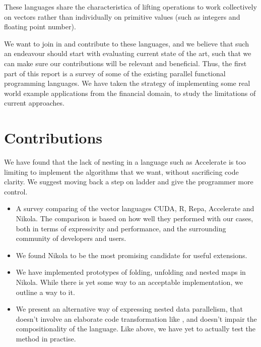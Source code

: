 These languages share the characteristica of lifting operations to
work collectively on vectors rather than individually on primitive
values (such as integers and floating point number).

We want to join in and contribute to these languages, and we believe
that such an endeavour should start with evaluating current state of
the art, such that we can make sure our contributions will be relevant
and beneficial. Thus, the first part of this report is a survey of
some of the existing parallel functional programming languages. We
have taken the strategy of implementing some real world example
applications from the financial domain, to study the limitations of
current approaches.

\section{Contributions}


We have found that the lack of nesting in a language such as
Accelerate is too limiting to implement the algorithms that we want,
without sacrificing code clarity. We suggest moving back a step on
ladder and give the programmer more control.



\begin{itemize}

\item A survey comparing of the vector languages CUDA, R, Repa, Accelerate and
  Nikola. The comparison is based on how well they performed with our cases,
  both in terms of expressivity and performance, and the surrounding community
  of developers and users.

\item We found Nikola to be the most promising candidate for useful extensions.

\item We have implemented prototypes of folding, unfolding and nested maps in
  Nikola. While there is yet some way to an acceptable implementation, we
  outline a way to it.

\item We present an alternative way of expressing nested data parallelism, that
  doesn't involve an elaborate code transformation like \cite{nesl}, and
  doesn't impair the compositionality of the language. Like above, we have yet
  to actually test the method in practise.

\end{itemize}

